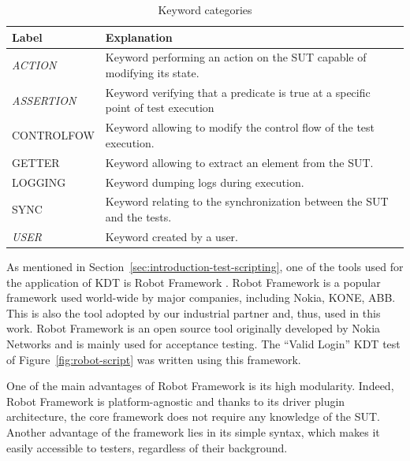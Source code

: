 \begin{table}
\caption{Keyword categories}
\label{keywords_categories}
\centering
\begin{tabular}{>{\raggedright}m{0.9in}>{\raggedright}m{4in}}
\toprule
\textbf{\scriptsize{Label}} & \textbf{\scriptsize{Explanation}}\tabularnewline
\toprule

\scriptsize{\textit{ACTION}} & \scriptsize{Keyword performing an action on the
SUT capable of modifying its state.} \tabularnewline

\scriptsize{\textit{ASSERTION}} & \scriptsize{Keyword verifying that a predicate
is true at a specific point of test execution} \tabularnewline

\scriptsize{CONTROLFOW} & \scriptsize{Keyword allowing to modify the
                                   control flow of the test execution.} \tabularnewline

\scriptsize{GETTER} & \scriptsize{Keyword allowing to extract an element from
the SUT.} \tabularnewline

\scriptsize{LOGGING} & \scriptsize{Keyword dumping logs during execution.}
\tabularnewline

\scriptsize{SYNC} & \scriptsize{Keyword relating to the
                                  synchronization between the SUT and the tests.} \tabularnewline

\scriptsize{\textit{USER}} & \scriptsize{Keyword created by a user.}
\tabularnewline

\bottomrule
\end{tabular}
\end{table}


As mentioned in Section~\ref{sec:introduction-test-scripting}, one of the tools used for the application of KDT is Robot Framework \cite{RobotFramework2020}. Robot Framework is a popular framework used world-wide by major companies, including Nokia, KONE, ABB. This is also the tool adopted by our industrial partner and, thus, used in this work. Robot Framework is an open source tool originally developed by Nokia Networks and is mainly used for acceptance testing. The ``Valid Login'' KDT test of Figure~\ref{fig:robot-script} was written using this framework.

One of the main advantages of Robot Framework is its high modularity.  Indeed, Robot Framework is platform-agnostic and thanks to its driver plugin architecture, the core framework does not require any knowledge of the SUT. Another advantage of the framework lies in its simple syntax, which makes it easily accessible to testers, regardless of their background.


